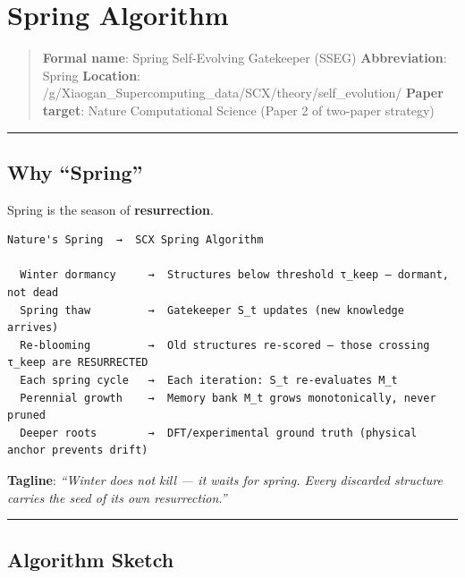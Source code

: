 \documentclass[
  12pt,
]{article}
\author{SCX}
\date{2026}
\begin{document}
\section{Spring Algorithm}\label{spring-algorithm}

\begin{quote}
\textbf{Formal name}: Spring Self-Evolving Gatekeeper (SSEG)
\textbf{Abbreviation}: Spring \textbf{Location}:
/g/Xiaogan\_Supercomputing\_data/SCX/theory/self\_evolution/
\textbf{Paper target}: Nature Computational Science (Paper 2 of
two-paper strategy)
\end{quote}

\begin{center}\rule{0.5\linewidth}{0.5pt}\end{center}

\subsection{Why ``Spring''}\label{why-spring}

Spring is the season of \textbf{resurrection}.

\begin{verbatim}
Nature's Spring  →  SCX Spring Algorithm

  Winter dormancy     →  Structures below threshold τ_keep — dormant, not dead
  Spring thaw         →  Gatekeeper S_t updates (new knowledge arrives)
  Re-blooming         →  Old structures re-scored — those crossing τ_keep are RESURRECTED
  Each spring cycle   →  Each iteration: S_t re-evaluates M_t
  Perennial growth    →  Memory bank M_t grows monotonically, never pruned
  Deeper roots        →  DFT/experimental ground truth (physical anchor prevents drift)
\end{verbatim}

\textbf{Tagline}: \emph{``Winter does not kill --- it waits for spring.
Every discarded structure carries the seed of its own resurrection.''}

\begin{center}\rule{0.5\linewidth}{0.5pt}\end{center}

\subsection{Algorithm Sketch}\label{algorithm-sketch}
\end{document}
